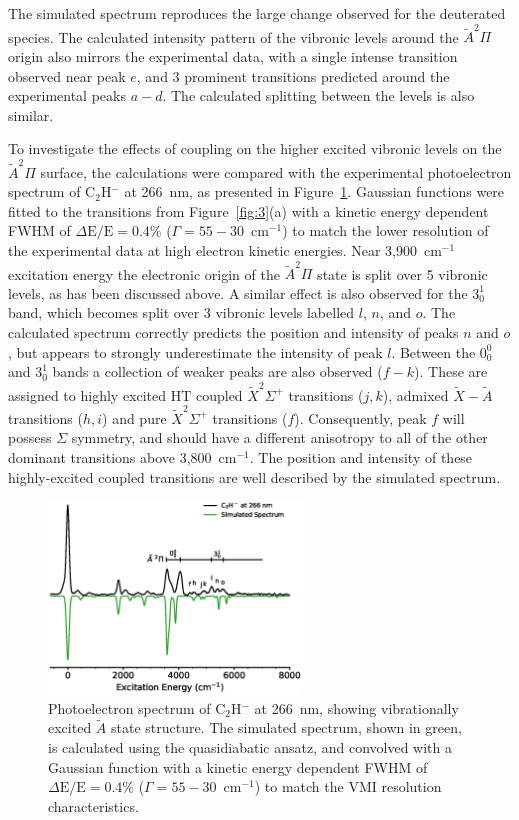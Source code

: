 \documentclass[aip,graphicx]{revtex4-1}
\begin{document}
The simulated spectrum reproduces the large change observed for the deuterated species. The calculated intensity pattern of the vibronic levels around the $\tilde{A} ^2\Pi$ origin also mirrors the experimental data, with a single intense transition observed near peak $e$, and 3 prominent transitions predicted around the experimental peaks $a-d$. The calculated splitting between the levels is also similar. 


To investigate the effects of coupling on the higher excited vibronic levels on the~$\tilde{A} ^2\Pi$ surface, the calculations were compared with the experimental photoelectron spectrum of C$_2$H$^-$ at 266~nm, as presented in Figure~\ref{fig:4}. Gaussian functions were fitted to the transitions from Figure~\ref{fig:3}(a) with a kinetic energy dependent FWHM of $\Delta\text{E}/\text{E} = 0.4\%$ ($\Gamma=55-30$~cm$^{-1}$) to match the lower resolution of the experimental data at high electron kinetic energies. Near 3,900~cm$^{-1}$ excitation energy the electronic origin of the $\tilde{A} ^2\Pi$ state is split over 5 vibronic levels, as has been discussed above. A similar effect is also observed for the $3^1_0$ band, which becomes split over 3 vibronic levels labelled $l$, $n$, and $o$. The calculated spectrum correctly predicts the position and intensity of peaks $n$ and $o$, but appears to strongly underestimate the intensity of peak $l$. Between the $0^0_0$ and $3^1_0$ bands a collection of weaker peaks are also observed ($f-k$). These are assigned to highly excited HT coupled $\tilde{X} ^2\Sigma^+$ transitions ($j,k$), admixed $\tilde{X}-\tilde{A}$ transitions ($h,i$) and pure $\tilde{X} ^2\Sigma^+$ transitions ($f$). Consequently, peak $f$ will possess $\Sigma$ symmetry, and should have a different anisotropy to all of the other dominant transitions above 3,800~cm$^{-1}$. The position and intensity of these highly-excited coupled transitions are well described by the simulated spectrum. 

\begin{figure}[th!]
	\includegraphics[width=0.6\textwidth]{figures/Fig4}
	\caption{Photoelectron spectrum of C$_2$H$^-$ at 266~nm, showing vibrationally excited $\tilde{A}$ state structure. The simulated spectrum, shown in green, is calculated using the quasidiabatic ansatz, and convolved with a Gaussian function with a kinetic energy dependent FWHM of $\Delta\text{E}/\text{E} = 0.4\%$ ($\Gamma=55-30$~cm$^{-1}$) to match the VMI resolution characteristics.}
	\label{fig:4}
\end{figure}
\end{document}
